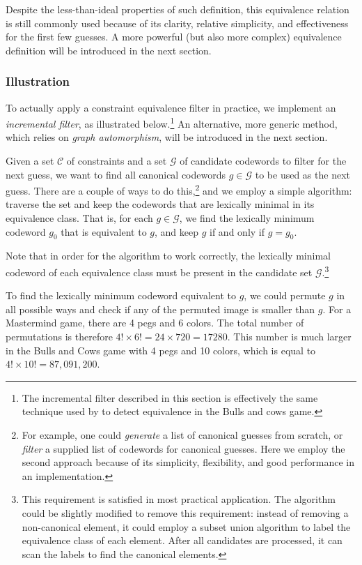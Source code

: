 Despite the less-than-ideal properties of such definition, this equivalence relation is still commonly used \cite{neuwirth81,koyama93,francis10} because of its clarity, relative simplicity, and effectiveness for the first few guesses. A more powerful (but also more complex) equivalence definition will be introduced in the next section.

\subsubsection{Illustration}

To actually apply a constraint equivalence filter in practice, we implement an \emph{incremental filter}, as illustrated below.\footnote{The incremental filter described in this section is effectively the same technique used by \cite{francis10} to detect equivalence in the Bulls and cows game.}
An alternative, more generic method, which relies on \emph{graph automorphism}, will be introduced in the next section.

Given a set $\mathcal{C}$ of constraints and a set $\mathcal{G}$ of candidate codewords to filter for the next guess, we want to find all canonical codewords $g \in \mathcal{G}$ to be used as the next guess. There are a couple of ways to do this,\footnote{For example, one could \emph{generate} a list of canonical guesses from scratch, or \emph{filter} a supplied list of codewords for canonical guesses. Here we employ the second approach because of its simplicity, flexibility, and good performance in an implementation.}
and we employ a simple algorithm: traverse the set and keep the codewords that are lexically minimal in its equivalence class. That is, for each $g \in \mathcal{G}$, we find the lexically minimum codeword $g_0$ that is equivalent to $g$, and keep $g$ if and only if $g = g_0$. 

Note that in order for the algorithm to work correctly, the lexically minimal codeword of each equivalence class must be present in the candidate set $\mathcal{G}$.\footnote{
This requirement is satisfied in most practical application. The algorithm could be slightly modified to remove this requirement: instead of removing a non-canonical element, it could employ a subset union algorithm to label the equivalence class of each element. After all candidates are processed, it can scan the labels to find the canonical elements.
}


To find the lexically minimum codeword equivalent to $g$, we could permute $g$ in all possible ways and check if any of the permuted image is smaller than $g$. For a Mastermind game, there are 4 pegs and 6 colors. The total number of permutations is therefore $4! \times 6! = 24 \times 720 = 17280$. This number is much larger in the Bulls and Cows game with 4 pegs and 10 colors, which is equal to $4! \times 10! = 87,091,200$.

